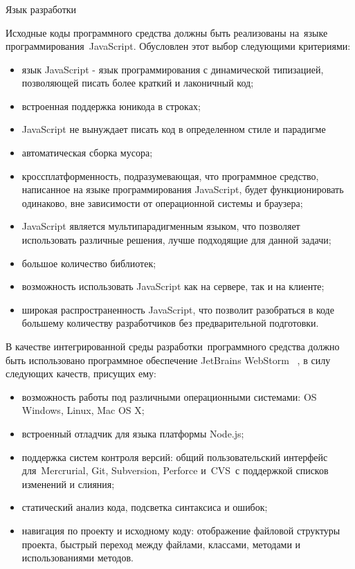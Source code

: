 \subsubsection{}Язык разработки

Исходные коды программного средства должны быть реализованы на языке программирования JavaScript. Обусловлен этот выбор следующими критериями:

\begin{itemize}
  \item язык JavaScript - язык программирования с динамической типизацией, позволяющей писать более краткий и лаконичный код;
  \item встроенная поддержка юникода в строках;
  \item JavaScript не вынуждает писать код в определенном стиле и парадигме
  \item автоматическая сборка мусора;
  \item кроссплатформенность, подразумевающая, что программное средство, написанное на языке программирования JavaScript, будет функционировать одинаково, вне зависимости от операционной системы и браузера;
  \item JavaScript является мультипарадигменным языком, что позволяет использовать различные решения, лучше подходящие для данной задачи;
  \item большое количество библиотек;
  \item возможность использовать JavaScript как на сервере, так и на клиенте;
  \item широкая распространенность JavaScript, что позволит разобраться в коде большему количеству разработчиков без предварительной подготовки.
\end{itemize}

В качестве интегрированной среды разработки программного средства должно быть использовано программное обеспечение JetBrains WebStorm ~\cite{webstorm}, в силу следующих качеств, присущих ему:
\begin{itemize}
  \item возможность работы под различными операционными системами: OS Windows, Linux, Mac OS X;
  \item встроенный отладчик для языка платформы Node.js;
  \item поддержка систем контроля версий: общий пользовательский интерфейс для Mercrurial, Git, Subversion, Perforce и CVS с поддержкой списков изменений и слияния;

  \item статический анализ кода, подсветка синтаксиса и ошибок;
  \item навигация по проекту и исходному коду: отображение файловой структуры проекта, быстрый переход между файлами, классами, методами и использованиями методов.
\end{itemize}

